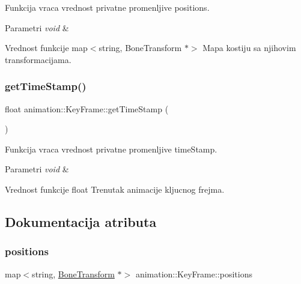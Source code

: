 Funkcija vraca vrednost privatne promenljive positions. 


\begin{DoxyParams}{Parametri}
{\em void} & \\
\hline
\end{DoxyParams}
\begin{DoxyReturn}{Vrednost funkcije}
map$<$string, Bone\+Transform $\ast$$>$ Mapa kostiju sa njihovim transformacijama. 
\end{DoxyReturn}
\mbox{\label{classanimation_1_1KeyFrame_ae4add751eb799ded63d21388c513402b}} 
\subsubsection{\texorpdfstring{get\+Time\+Stamp()}{getTimeStamp()}}
{\footnotesize\ttfamily float animation\+::\+Key\+Frame\+::get\+Time\+Stamp (\begin{DoxyParamCaption}{ }\end{DoxyParamCaption})}



Funkcija vraca vrednost privatne promenljive time\+Stamp. 


\begin{DoxyParams}{Parametri}
{\em void} & \\
\hline
\end{DoxyParams}
\begin{DoxyReturn}{Vrednost funkcije}
float Trenutak animacije kljucnog frejma. 
\end{DoxyReturn}


\subsection{Dokumentacija atributa}
\mbox{\label{classanimation_1_1KeyFrame_a8e01baabf041ee027a0166670ad30e96}} 
\subsubsection{\texorpdfstring{positions}{positions}}
{\footnotesize\ttfamily map$<$string, \hyperlink{classanimation_1_1BoneTransform}{Bone\+Transform} $\ast$$>$ animation\+::\+Key\+Frame\+::positions\hspace{0.3cm}{\ttfamily [private]}}




